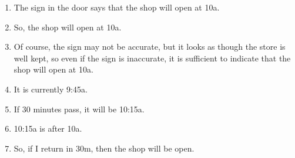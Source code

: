\begin{note}
  \begin{illustration}
    \label{ill:waiting-for-shop}
    \mbox{}
    \vspace{-\baselineskip}
    \begin{enumerate}
    \item The sign in the door says that the shop will open at 10a.
    \item So, the shop will open at 10a.
    \item\label{ill:waiting-for-shop:reasoning} Of course, the sign may not be accurate, but it looks as though the store is well kept, so even if the sign is inaccurate, it is sufficient to indicate that the shop will open at 10a.
    \item\label{ill:waiting-for-shop:current-time} It is currently 9:45a.
    \item If 30 minutes pass, it will be 10:15a.
    \item 10:15a is after 10a.
    \item\label{ill:waiting-for-shop:return} So, if I return in 30m, then the shop will be open.
    \end{enumerate}
    \vspace{-\baselineskip}
  \end{illustration}
\end{note}

